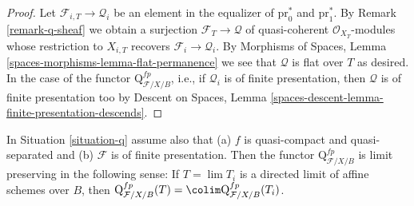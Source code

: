 \begin{proof}
Let $\mathcal{F}_{i, T} \to \mathcal{Q}_i$ be an element in the equalizer
of $\text{pr}_0^*$ and $\text{pr}_1^*$. By Remark \ref{remark-q-sheaf}
we obtain a surjection $\mathcal{F}_T \to \mathcal{Q}$ of quasi-coherent
$\mathcal{O}_{X_T}$-modules whose restriction to $X_{i, T}$ recovers
$\mathcal{F}_i \to \mathcal{Q}_i$.
By Morphisms of Spaces, Lemma \ref{spaces-morphisms-lemma-flat-permanence}
we see that $\mathcal{Q}$ is flat over $T$ as desired.
In the case of the functor $\text{Q}^{fp}_{\mathcal{F}/X/B}$, i.e.,
if $\mathcal{Q}_i$ is of finite presentation, then
$\mathcal{Q}$ is of finite presentation too by
Descent on Spaces, Lemma
\ref{spaces-descent-lemma-finite-presentation-descends}.
\end{proof}

\begin{lemma}
\label{lemma-q-limit-preserving}
In Situation \ref{situation-q} assume also that
(a) $f$ is quasi-compact and quasi-separated and
(b) $\mathcal{F}$ is of finite presentation.
Then the functor $\text{Q}^{fp}_{\mathcal{F}/X/B}$
is limit preserving in the following sense: If $T = \lim T_i$ is a
directed limit of affine schemes over $B$, then
$\text{Q}^{fp}_{\mathcal{F}/X/B}(T) =
\colim \text{Q}^{fp}_{\mathcal{F}/X/B}(T_i)$.
\end{lemma}

